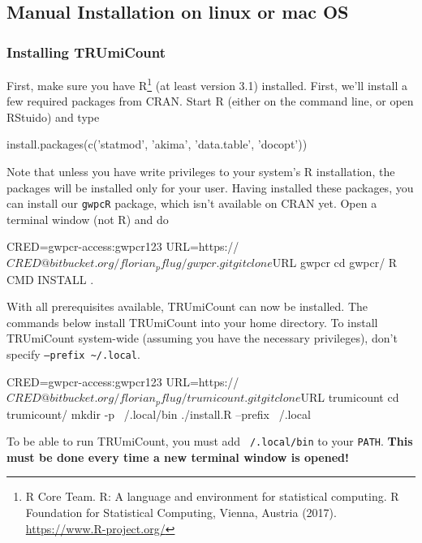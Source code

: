 \documentclass[10pt]{article}
\begin{document}
\pagebreak
\subsection{Manual Installation on linux or mac OS}

\subsubsection*{Installing TRUmiCount}

First, make sure you have R\footnote{R Core Team. R: A language and environment for statistical
  computing. R Foundation for Statistical Computing, Vienna, Austria (2017). \url{https://www.R-project.org/}} (at least version 3.1) installed. First, we'll install a few required packages from CRAN. Start R (either on the command line, or open RStuido) and type

\begin{Rcode}
install.packages(c('statmod', 'akima', 'data.table', 'docopt'))
\end{Rcode}

Note that unless you have write privileges to your system's R installation, the packages will be installed only for your user. Having installed these packages, you can install our \texttt{gwpcR} package, which isn't available on CRAN yet. Open a terminal window (not R) and do
  
\begin{shellcode}
CRED=gwpcr-access:gwpcr123
URL=https://$CRED@bitbucket.org/florian_pflug/gwpcr.git
git clone $URL gwpcr
cd gwpcr/
R CMD INSTALL .
\end{shellcode}

With all prerequisites available, TRUmiCount can now be installed. The commands below install TRUmiCount into your home directory. To install TRUmiCount system-wide (assuming you have the necessary privileges), don't specify \texttt{--prefix \textasciitilde/.local}.

\begin{shellcode}
CRED=gwpcr-access:gwpcr123
URL=https://$CRED@bitbucket.org/florian_pflug/trumicount.git
git clone $URL trumicount
cd trumicount/
mkdir -p ~/.local/bin
./install.R --prefix ~/.local
\end{shellcode}

To be able to run TRUmiCount, you must add \texttt{~/.local/bin} to your \texttt{PATH}. \textbf{This must be done every time a new terminal window is opened!}

\end{document}
